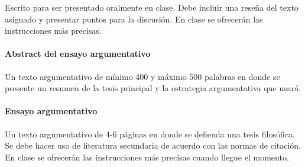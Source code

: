 \documentclass[]{article}
\let\oldparagraph\paragraph
\renewcommand{\paragraph}[1]{\oldparagraph{#1}\mbox{}}
\begin{document}
Escrito para ser presentado oralmente en clase. Debe incluir una reseña
del texto asignado y presentar puntos para la discusión. En clase se
ofrecerán las instrucciones más precisas.

\paragraph{Abstract del ensayo
argumentativo}\label{abstract-del-ensayo-argumentativo}

Un texto argumentativo de mínimo 400 y máximo 500 palabras en donde se
presente un resumen de la tesis principal y la estrategia argumentativa
que usará.

\paragraph{Ensayo argumentativo}\label{ensayo-argumentativo}

Un texto argumentativo de 4-6 páginas en donde se defienda una tesis
filosófica. Se debe hacer uso de literatura secundaria de acuerdo con
las normas de citación. En clase se ofrecerán las instrucciones más
precisas cuando llegue el momento.

\nocite{*}
\printbibliography
\end{document}
